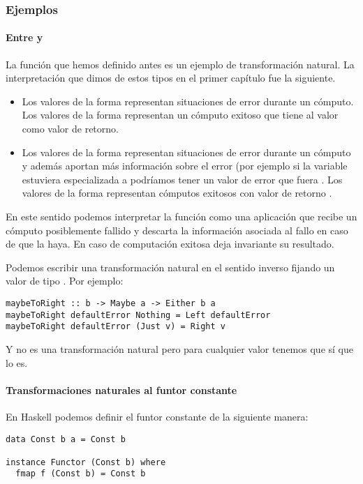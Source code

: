 \subsubsection{Ejemplos}
\paragraph{Entre  y }
La función  que hemos definido
antes es un ejemplo de transformación natural. La interpretación
que dimos de estos tipos en el primer capítulo fue la siguiente.
\begin{itemize}
\item Los valores de la forma  representan
  situaciones de error durante un cómputo. Los valores de la forma
   representan un cómputo exitoso que tiene
  al valor  como valor de retorno.
\item Los valores de la forma  representan
  situaciones de error durante un cómputo y además aportan más información
  sobre el error (por ejemplo si la variable  estuviera
  especializada a  podríamos tener un valor de error
  que fuera . Los
  valores de la forma  representan cómputos
  exitosos con valor de retorno .
\end{itemize}

En este sentido podemos interpretar la función  como
una aplicación que recibe un cómputo posiblemente fallido y descarta
la información asociada al fallo en caso de que la haya. En caso de
computación exitosa deja invariante su resultado.

Podemos escribir una transformación natural en el sentido inverso
fijando un valor de tipo . Por ejemplo:
\begin{verbatim}
maybeToRight :: b -> Maybe a -> Either b a
maybeToRight defaultError Nothing = Left defaultError
maybeToRight defaultError (Just v) = Right v
\end{verbatim}

Y  no es una transformación natural pero para
cualquier valor  tenemos que
 sí que lo es.

\paragraph{Transformaciones naturales al funtor constante}
En Haskell podemos definir el funtor constante de la siguiente
manera:
\begin{verbatim}
data Const b a = Const b

instance Functor (Const b) where
  fmap f (Const b) = Const b
\end{verbatim}

